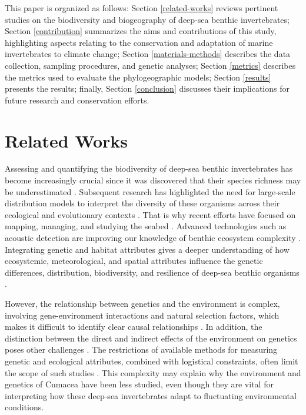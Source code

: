 This paper is organized as follows: Section \autoref{related-works} reviews pertinent studies on the biodiversity and biogeography of deep-sea benthic invertebrates; Section \autoref{contribution} summarizes the aims and contributions of this study, highlighting aspects relating to the conservation and adaptation of marine invertebrates to climate change; Section \autoref{materials-methods} describes the data collection, sampling procedures, and genetic analyses; Section \autoref{metrics} describes the metrics used to evaluate the phylogeographic models; Section \autoref{results} presents the results; finally, Section \autoref{conclusion} discusses their implications for future research and conservation efforts.

\section{Related Works}\label{related-works}
Assessing and quantifying the biodiversity of deep-sea benthic invertebrates has become increasingly crucial since it was discovered that their species richness may be underestimated \citep{grassle1992deep}. Subsequent research has highlighted the need for large-scale distribution models to interpret the diversity of these organisms across their ecological and evolutionary contexts \citep{rex1997large}. That is why recent efforts have focused on mapping, managing, and studying the seabed \citep{brown2011benthic}. Advanced technologies such as acoustic detection are improving our knowledge of benthic ecosystem complexity \citep{brown2011benthic}. Integrating genetic and habitat attributes gives a deeper understanding of how ecosystemic, meteorological, and spatial attributes influence the genetic differences, distribution, biodiversity, and resilience of deep-sea benthic organisms \citep{vrijenhoek2009cryptic}.

However, the relationship between genetics and the environment is complex, involving gene-environment interactions and natural selection factors, which makes it difficult to identify clear causal relationships \citep{balkenhol_identifying_2009}. In addition, the distinction between the direct and indirect effects of the environment on genetics poses other challenges \citep{manel_perspectives_2010, balkenhol_landscape_2019}. The restrictions of available methods for measuring genetic and ecological attributes, combined with logistical constraints, often limit the scope of such studies \citep{manel_perspectives_2010, shafer_widespread_2013}. This complexity may explain why the environment and genetics of Cumacea have been less studied, even though they are vital for interpreting how these deep-sea invertebrates adapt to fluctuating environmental conditions.

